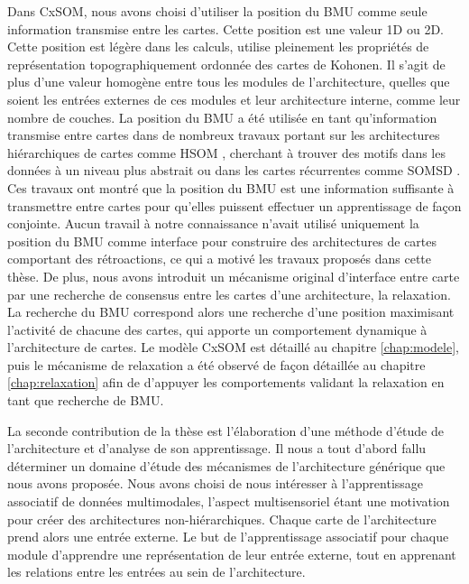 Dans CxSOM, nous avons choisi d'utiliser la position du BMU comme seule information transmise entre les cartes. Cette position est une valeur 1D ou 2D. 
Cette position est légère dans les calculs, utilise pleinement les propriétés de représentation topographiquement ordonnée des cartes de Kohonen. Il s'agit de plus d'une valeur homogène entre tous les modules de l'architecture, quelles que soient les entrées externes de ces modules et leur architecture interne, comme leur nombre de couches.
La position du BMU a été utilisée en tant qu'information transmise entre cartes dans de nombreux travaux portant sur les architectures hiérarchiques de cartes comme HSOM \cite{lampinen_clustering_1992}, cherchant à trouver des motifs dans les données à un niveau plus abstrait ou  dans les cartes récurrentes comme SOMSD \cite{hagenbuchner_self-organizing_2003}. 
Ces travaux ont montré que la position du BMU est une information suffisante à transmettre entre cartes pour qu'elles puissent effectuer un apprentissage de façon conjointe.
Aucun travail à notre connaissance n'avait utilisé uniquement la position du BMU comme interface pour construire des architectures de cartes comportant des rétroactions, ce qui a motivé les travaux proposés dans cette thèse.
De plus, nous avons introduit un mécanisme original d'interface entre carte par une recherche de consensus entre les cartes d'une architecture, la relaxation.
La recherche du BMU correspond alors une recherche d'une position maximisant l'activité de chacune des cartes, qui apporte un comportement dynamique à l'architecture de cartes.
Le modèle CxSOM est détaillé au chapitre \ref{chap:modele}, puis le mécanisme de relaxation a été observé de façon détaillée au chapitre \ref{chap:relaxation} afin de d'appuyer les comportements validant la relaxation en tant que recherche de BMU.

La seconde contribution de la thèse est l'élaboration d'une méthode d'étude de l'architecture et d'analyse de son apprentissage. 
Il nous a tout d'abord fallu déterminer un domaine d'étude des mécanismes de l'architecture générique que nous avons proposée. Nous avons choisi de nous intéresser à l'apprentissage associatif de données multimodales, l'aspect multisensoriel étant une motivation pour créer des architectures non-hiérarchiques. Chaque carte de l'architecture prend alors une entrée externe.
Le but de l'apprentissage associatif pour chaque module d'apprendre une représentation de leur entrée externe, tout en apprenant les relations entre les entrées au sein de l'architecture.


